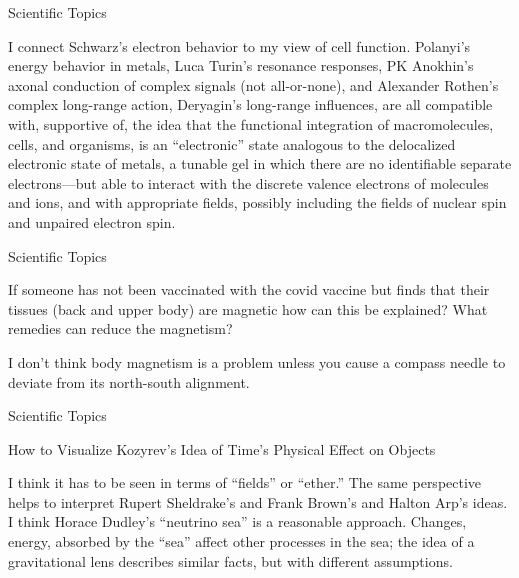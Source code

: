\documentclass[11pt,oneside,openany,extrafontsizes]{memoir}
\begin{document}
\begin{standalonequote}{Scientific Topics}

    \begin{answer}
      I connect Schwarz's electron behavior to my view of cell function. Polanyi's energy behavior in metals, Luca Turin's resonance responses, PK Anokhin's axonal conduction of complex signals (not all-or-none), and Alexander Rothen's complex long-range action, Deryagin's long-range influences, are all compatible with, supportive of, the idea that the functional integration of macromolecules, cells, and organisms, is an \enquote{electronic} state analogous to the delocalized electronic state of metals, a tunable gel in which there are no identifiable separate electrons—but able to interact with the discrete valence electrons of molecules and ions, and with appropriate fields, possibly including the fields of nuclear spin and unpaired electron spin.
    \end{answer}
\end{standalonequote}

\begin{qaexchange}{Scientific Topics}

    \begin{question}
       If someone has not been vaccinated with the covid vaccine but finds that their tissues (back and upper body) are magnetic how can this be explained? What remedies can reduce the magnetism?
    \end{question}

    \begin{answer}
       I don't think body magnetism is a problem unless you cause a compass needle to deviate from its north-south alignment.
    \end{answer}
\end{qaexchange}

\begin{standalonequote}{Scientific Topics}

    \begin{note}
        How to Visualize Kozyrev's Idea of Time's Physical Effect on Objects
    \end{note}

    \begin{answer}
      I think it has to be seen in terms of \enquote{fields} or \enquote{ether.} The same perspective helps to interpret Rupert Sheldrake's and Frank Brown's and Halton Arp's ideas. I think Horace Dudley's \enquote{neutrino sea} is a reasonable approach. Changes, energy, absorbed by the \enquote{sea} affect other processes in the sea; the idea of a gravitational lens describes similar facts, but with different assumptions.
    \end{answer}
\end{standalonequote}
\end{document}
